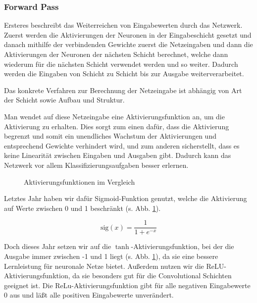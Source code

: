 \documentclass[10pt]{article}
\newcommand{\sig}{\textrm{sig}}
\begin{document}
\subsubsection{Forward Pass}

Ersteres beschreibt das Weiterreichen %
von Eingabewerten durch das Netzwerk.
Zuerst werden die Aktivierungen der Neuronen in der Eingabeschicht gesetzt und danach mithilfe der verbindenden Gewichte zuerst die Netzeingaben und dann die Aktivierungen der Neuronen der nächsten Schicht berechnet, welche dann wiederum für die nächsten Schicht verwendet werden und so weiter.
Dadurch werden die Eingaben von Schicht zu Schicht bis zur Ausgabe weiterverarbeitet.

Das konkrete Verfahren zur Berechnung der Netzeingabe ist abhängig von Art der Schicht sowie Aufbau und Struktur.

Man wendet auf diese Netzeingabe eine Aktivierungsfunktion an, um die Aktivierung zu erhalten.
Dies sorgt zum einen dafür, dass die Aktivierung begrenzt und somit ein unendliches Wachstum der Aktivierungen und entsprechend Gewichte verhindert wird, und zum anderen sicherstellt, dass es keine Linearität zwischen Eingaben und Ausgaben gibt. 
Dadurch kann das Netzwerk vor allem Klassifizierungsaufgaben besser erlernen. %

\begin{figure}[h!]
    \centering
    \caption{Aktivierungsfunktionen im Vergleich}
    \label{fig:act_funcs}
\end{figure}

Letztes Jahr haben wir dafür Sigmoid-Funktion genutzt, welche die Aktivierung auf Werte zwischen 0 und 1 beschränkt (s. Abb. \ref{fig:act_funcs}).

\[
    \sig(x) = \frac{1}{1+e^{-x}}
\]

Doch dieses Jahr setzen wir auf die $\tanh$-Aktivierungsfunktion, bei der die Ausgabe immer zwischen -1 und 1 liegt (s. Abb. \ref{fig:act_funcs}), da sie 
eine bessere Lernleistung für neuronale Netze bietet. \cite{blog:activationFunctions, blog:tanhVsSigmoid} Außerdem nutzen wir die ReLU-Aktivierungsfunktion, da sie besonders gut für die Convolutional Schichten geeignet ist. Die ReLu-Aktivierungsfunktion gibt für alle negativen Eingabewerte 0 aus und läßt alle positiven Eingabewerte unverändert.
\end{document}
